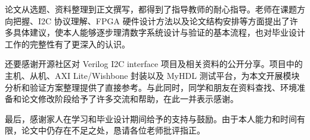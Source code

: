 论文从选题、资料整理到正文撰写，都得到了指导教师的耐心指导。老师在课题方向把握、I2C
协议理解、FPGA
硬件设计方法以及论文结构安排等方面提出了许多具体建议，使本人能够逐步理清数字系统设计与验证的基本流程，也对毕业设计工作的完整性有了更深入的认识。

还要感谢开源社区对 Verilog I2C interface
项目及相关资料的公开分享。项目中的主机、从机、AXI Lite/Wishbone 封装以及
MyHDL
测试平台，为本文开展模块分析和验证方案整理提供了直接参考。与此同时，同学和朋友在资料查找、环境准备和论文修改阶段给予了许多交流和帮助，在此一并表示感谢。

最后，感谢家人在学习和毕业设计期间给予的支持与鼓励。由于本人能力和时间有限，论文中仍存在不足之处，恳请各位老师批评指正。
